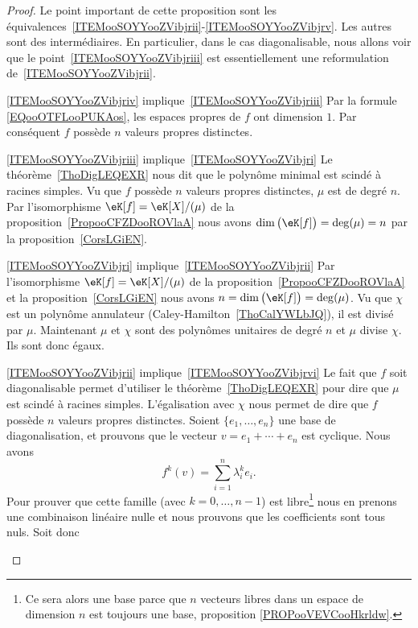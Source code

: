 \begin{proof}
    Le point important de cette proposition sont les équivalences~\ref{ITEMooSOYYooZVibjrii}-\ref{ITEMooSOYYooZVibjrv}. Les autres sont des intermédiaires. En particulier, dans le cas diagonalisable, nous allons voir que le point~\ref{ITEMooSOYYooZVibjriii} est essentiellement une reformulation de~\ref{ITEMooSOYYooZVibjrii}.
    \begin{subproof}
        \item[\ref{ITEMooSOYYooZVibjriv} implique~\ref{ITEMooSOYYooZVibjriii}]
            Par la formule \eqref{EQooOTFLooPUKAos}, les espaces propres de \( f\) ont dimension \( 1\). Par conséquent \( f\) possède \( n\) valeurs propres distinctes.
        \item[\ref{ITEMooSOYYooZVibjriii} implique~\ref{ITEMooSOYYooZVibjri}]
            Le théorème~\ref{ThoDigLEQEXR} nous dit que le polynôme minimal est scindé à racines simples. Vu que \( f\) possède \( n\) valeurs propres distinctes, \( \mu\) est de degré \( n\).  Par l'isomorphisme \( \eK[f]=\eK[X]/(\mu)\) de la proposition~\ref{PropooCFZDooROVlaA} nous avons \(\dim\big( \eK[f] \big)= \deg(\mu)=n\) par la proposition~\ref{CorsLGiEN}.
        \item[\ref{ITEMooSOYYooZVibjri} implique~\ref{ITEMooSOYYooZVibjrii}]
            Par l'isomorphisme \( \eK[f]=\eK[X]/(\mu)\) de la proposition~\ref{PropooCFZDooROVlaA} et la proposition~\ref{CorsLGiEN} nous avons \(n=\dim\big( \eK[f] \big)= \deg(\mu)\). Vu que \( \chi\) est un polynôme annulateur (Caley-Hamilton~\ref{ThoCalYWLbJQ}), il est divisé par \( \mu\). Maintenant \( \mu\) et \( \chi\) sont des polynômes unitaires de degré \( n\) et \( \mu\) divise \( \chi\). Ils sont donc égaux.
        \item[\ref{ITEMooSOYYooZVibjrii} implique~\ref{ITEMooSOYYooZVibjrvi}]
            Le fait que $f$ soit diagonalisable permet d'utiliser le théorème~\ref{ThoDigLEQEXR} pour dire que \( \mu\) est scindé à racines simples. L'égalisation avec \( \chi \) nous permet de dire que \( f\) possède \( n\) valeurs propres distinctes. Soient \( \{ e_1,\ldots, e_n \}\) une base de diagonalisation, et prouvons que le vecteur \( v=e_1+\cdots +e_n\) est cyclique. Nous avons
            \begin{equation}
                f^k(v)=\sum_{i=1}^n\lambda_i^ke_i.
            \end{equation}
            Pour prouver que cette famille (avec \( k=0,\ldots, n-1\)) est libre\footnote{Ce sera alors une base parce que \( n\) vecteurs libres dans un espace de dimension \( n\) est toujours une base, proposition \ref{PROPooVEVCooHkrldw}.} nous en prenons une combinaison linéaire nulle et nous prouvons que les coefficients sont tous nuls. Soit donc

\end{subproof}
\end{proof}
